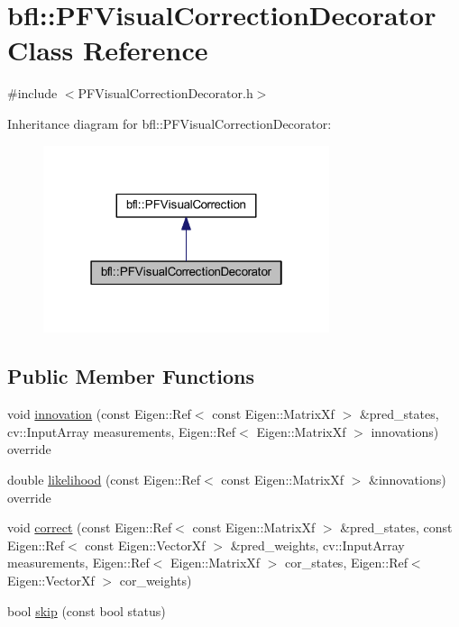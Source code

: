 \hypertarget{classbfl_1_1PFVisualCorrectionDecorator}{}\section{bfl\+:\+:P\+F\+Visual\+Correction\+Decorator Class Reference}
\label{classbfl_1_1PFVisualCorrectionDecorator}


{\ttfamily \#include $<$P\+F\+Visual\+Correction\+Decorator.\+h$>$}



Inheritance diagram for bfl\+:\+:P\+F\+Visual\+Correction\+Decorator\+:
\nopagebreak
\begin{figure}[H]
\begin{center}
\leavevmode
\includegraphics[width=238pt]{classbfl_1_1PFVisualCorrectionDecorator__inherit__graph}
\end{center}
\end{figure}
\subsection*{Public Member Functions}
\begin{DoxyCompactItemize}
\item 
void \mbox{\hyperlink{classbfl_1_1PFVisualCorrectionDecorator_abf6fcd12be618e8eda474b4c9638760e}{innovation}} (const Eigen\+::\+Ref$<$ const Eigen\+::\+Matrix\+Xf $>$ \&pred\+\_\+states, cv\+::\+Input\+Array measurements, Eigen\+::\+Ref$<$ Eigen\+::\+Matrix\+Xf $>$ innovations) override
\item 
double \mbox{\hyperlink{classbfl_1_1PFVisualCorrectionDecorator_a6e1f993c57e8bdbb03ad6996aa122c6c}{likelihood}} (const Eigen\+::\+Ref$<$ const Eigen\+::\+Matrix\+Xf $>$ \&innovations) override
\item 
void \mbox{\hyperlink{classbfl_1_1PFVisualCorrection_a85b68264ccaf46d5e68f8ea9c93d82cd}{correct}} (const Eigen\+::\+Ref$<$ const Eigen\+::\+Matrix\+Xf $>$ \&pred\+\_\+states, const Eigen\+::\+Ref$<$ const Eigen\+::\+Vector\+Xf $>$ \&pred\+\_\+weights, cv\+::\+Input\+Array measurements, Eigen\+::\+Ref$<$ Eigen\+::\+Matrix\+Xf $>$ cor\+\_\+states, Eigen\+::\+Ref$<$ Eigen\+::\+Vector\+Xf $>$ cor\+\_\+weights)
\item 
bool \mbox{\hyperlink{classbfl_1_1PFVisualCorrection_afbe70e2ab0be5459c79fe4eabd27cf9f}{skip}} (const bool status)
\end{DoxyCompactItemize}
